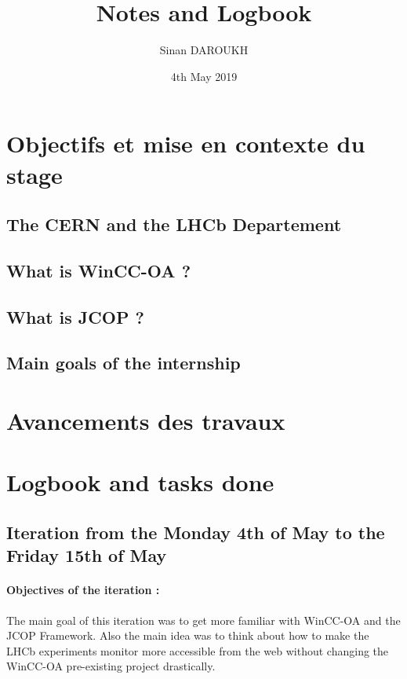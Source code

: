 \documentclass[a4paper, 10pt]{article}
\title{Notes and Logbook}
\author{Sinan DAROUKH}
\date{4th May 2019}
\begin{document}
\begin{titlepage}
\maketitle
\end{titlepage}

\tableofcontents
\newpage

\section{Objectifs et mise en contexte du stage}
\subsection{The CERN and the LHCb Departement}
\subsection{What is WinCC-OA ?}
\subsection{What is JCOP ?}
\subsection{Main goals of the internship}
\section{Avancements des travaux}
\section{Logbook and tasks done}
\footnotesize
\subsection{Iteration from the Monday 4th of May to the Friday 15th of May}
\paragraph{Objectives of the iteration :} 
The main goal of this iteration was to get more familiar with WinCC-OA and the JCOP Framework. Also the main idea was to think about how to make the LHCb experiments monitor more accessible from the web without changing the WinCC-OA pre-existing project drastically.
\end{document}
